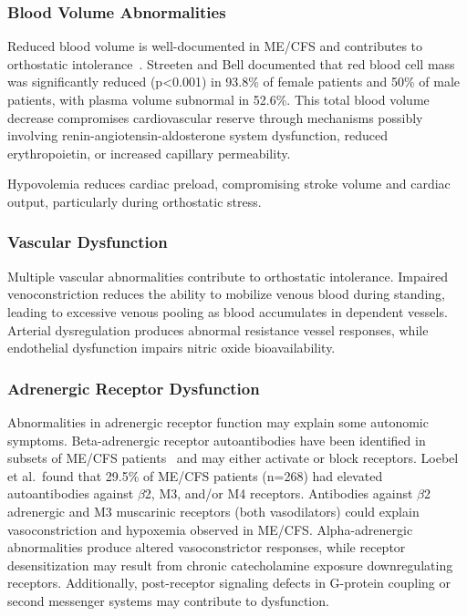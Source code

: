 \subsubsection{Blood Volume Abnormalities}

Reduced blood volume is well-documented in ME/CFS and contributes to orthostatic intolerance~\cite{Streeten1998blood}. Streeten and Bell documented that red blood cell mass was significantly reduced (p<0.001) in 93.8\% of female patients and 50\% of male patients, with plasma volume subnormal in 52.6\%. This total blood volume decrease compromises cardiovascular reserve through mechanisms possibly involving renin-angiotensin-aldosterone system dysfunction, reduced erythropoietin, or increased capillary permeability.

Hypovolemia reduces cardiac preload, compromising stroke volume and cardiac output, particularly during orthostatic stress.

\subsubsection{Vascular Dysfunction}

Multiple vascular abnormalities contribute to orthostatic intolerance. Impaired venoconstriction reduces the ability to mobilize venous blood during standing, leading to excessive venous pooling as blood accumulates in dependent vessels. Arterial dysregulation produces abnormal resistance vessel responses, while endothelial dysfunction impairs nitric oxide bioavailability.

\subsubsection{Adrenergic Receptor Dysfunction}

Abnormalities in adrenergic receptor function may explain some autonomic symptoms. Beta-adrenergic receptor autoantibodies have been identified in subsets of ME/CFS patients~\cite{Loebel2016} and may either activate or block receptors. Loebel et al.\ found that 29.5\% of ME/CFS patients (n=268) had elevated autoantibodies against $\beta$2, M3, and/or M4 receptors. Antibodies against $\beta$2 adrenergic and M3 muscarinic receptors (both vasodilators) could explain vasoconstriction and hypoxemia observed in ME/CFS. Alpha-adrenergic abnormalities produce altered vasoconstrictor responses, while receptor desensitization may result from chronic catecholamine exposure downregulating receptors. Additionally, post-receptor signaling defects in G-protein coupling or second messenger systems may contribute to dysfunction.

